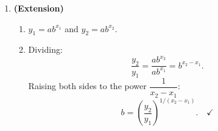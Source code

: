 \documentclass[10pt]{article}
\begin{document}
\begin{enumerate}[itemsep=16pt]
      \textit{Table A has constant differences (linear); Table C is $y=x^2$ (quadratic); Table D has
      $y=0$ at $x=0$, which is impossible for $f(x)=ab^x$ since $a = f(0) = 0$ would make
      $f$ identically zero.}

\item \textbf{(Extension)}

      \begin{enumerate}[label=(\alph*), itemsep=8pt]
        \item $y_1 = ab^{x_1}$ \quad and \quad $y_2 = ab^{x_2}$.

        \item Dividing:
              \[
                \frac{y_2}{y_1} = \frac{ab^{x_2}}{ab^{x_1}} = b^{x_2 - x_1}.
              \]
              Raising both sides to the power $\dfrac{1}{x_2 - x_1}$:
              \[
                b = \left(\frac{y_2}{y_1}\right)^{1/(x_2 - x_1)}. \quad \checkmark
              \]
      \end{enumerate}

\end{enumerate}
\end{document}
